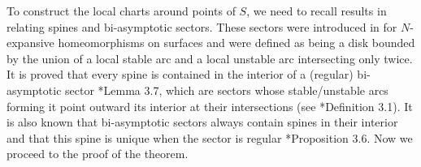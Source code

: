 \documentclass{amsart}
\newcommand{\blue}{\color{blue}}
\newcommand{\red}{\color{red}}
\theoremstyle{plain}
\newtheorem{corollary}[theorem]{Corollary}
\theoremstyle{definition}
\newcommand{\Z}{\mathbb{Z}}
\begin{document}




To construct the local charts around points of $S$, we need to recall results in \cite{ACS} relating spines and bi-asymptotic sectors. These sectors were introduced in \cite{APV} for $N$-expansive homeomorphisms on surfaces and were defined as being a disk bounded by the union of a local stable arc and a local unstable arc intersecting only twice. It is proved that every spine is contained in the interior of a (regular) bi-asymptotic sector \cite{ACS}*{Lemma 3.7}, which are sectors whose stable/unstable arcs forming it point outward its interior at their intersections (see \cite{ACS}*{Definition 3.1}). It is also known that bi-asymptotic sectors always contain spines in their interior and that this spine is unique when the sector is regular \cite{ACS}*{Proposition 3.6}. Now we proceed to the proof of the theorem.
\end{document}
